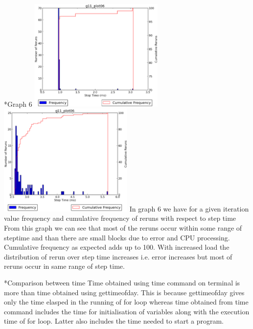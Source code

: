 \documentclass[11pt]{article}
\begin{document}
\begin{subsection}*{Graph 6}
\includegraphics[width=0.5\textwidth,keepaspectratio]{6.eps} \includegraphics[width=0.5\textwidth,keepaspectratio]{load_6.eps}
In graph 6 we have for a given iteration value frequency and cumulative frequency of reruns with respect to step time
From this graph we can see that most of the reruns occur within some range of steptime and than there are small blocks due to error and CPU processing. Cumulative frequency as expected adds up to 100.
With increased load the distribution of rerun over step time increases i.e. error increases but most of reruns occur in same range of step time.
\end{subsection}

\begin{subsection}*{Comparison between time} 
Time obtained using time command on terminal is more than time obtained using gettimeofday. This is because gettimeofday gives only the time elasped in the running of for loop whereas time obtained from time command includes the time for initialisation of variables along with the execution time of for loop. Latter also includes the time needed to start a program. ~\cite{Time} 
\end{subsection}
\pagebreak
\end{document}

